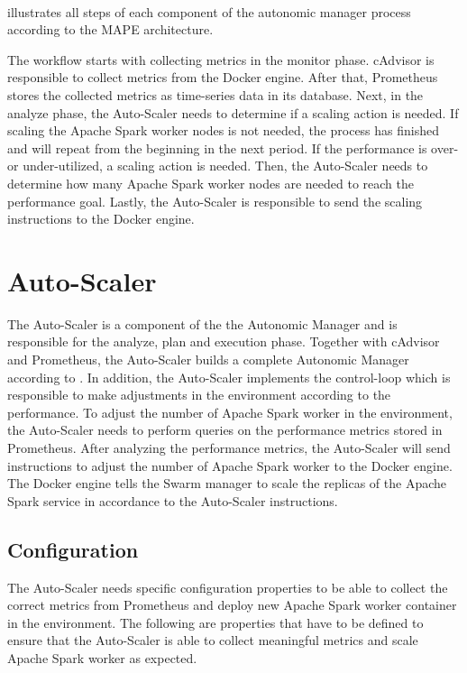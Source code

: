 \paragraph{}  illustrates all steps of each component of the autonomic manager process according to the MAPE architecture.


The workflow starts with collecting metrics in the monitor phase. cAdvisor is responsible to collect metrics from the Docker engine. After that, Prometheus stores the collected metrics as time-series data in its database.
Next, in the analyze phase, the Auto-Scaler needs to determine if a scaling action is needed. If scaling the Apache Spark worker nodes is not needed, the process has finished and will repeat from the beginning in the next period.
If the performance is over- or under-utilized, a scaling action is needed. Then, the Auto-Scaler needs to determine how many Apache Spark worker nodes are needed to reach the performance goal.
Lastly, the Auto-Scaler is responsible to send the scaling instructions to the Docker engine.


\section{Auto-Scaler}
\label{sec:05_auto-scaler}
The Auto-Scaler is a component of the the Autonomic Manager and is responsible for the analyze, plan and execution phase.
Together with cAdvisor and Prometheus, the Auto-Scaler builds a complete Autonomic Manager according to .
In addition, the Auto-Scaler implements the control-loop which is responsible to make adjustments in the environment according to the performance.
To adjust the number of Apache Spark worker in the environment, the Auto-Scaler needs to perform queries on the performance metrics stored in Prometheus.
After analyzing the performance metrics, the Auto-Scaler will send instructions to adjust the number of Apache Spark worker to the Docker engine. The Docker engine tells the Swarm manager to scale the replicas of the Apache Spark service in accordance to the Auto-Scaler instructions.



\subsection{Configuration}
\label{subsec:05_auto-scaler_configuration}
The Auto-Scaler needs specific configuration properties to be able to collect the correct metrics from Prometheus and deploy new Apache Spark worker container in the environment. The following are properties that have to be defined to ensure that the Auto-Scaler is able to collect meaningful metrics and scale Apache Spark worker as expected.

